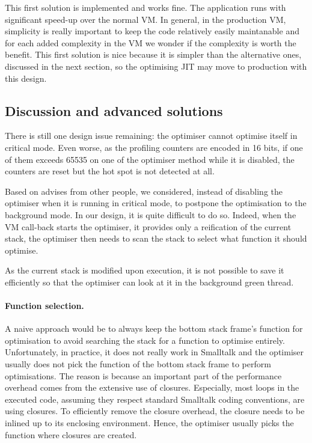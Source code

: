 \documentclass[a4paper,12pt,twoside]{../includes/ThesisStyle}
\begin{document}
This first solution is implemented and works fine. The application runs with significant speed-up over the normal VM. In general, in the production VM, simplicity is really important to keep the code relatively easily maintanable and for each added complexity in the VM we wonder if the complexity is worth the benefit. This first solution is nice because it is simpler than the alternative ones, discussed in the next section, so the optimising JIT may move to production with this design.

\subsection{Discussion and advanced solutions}

There is still one design issue remaining: the optimiser cannot optimise itself in critical mode. Even worse, as the profiling counters are encoded in 16 bits, if one of them exceeds 65535 on one of the optimiser method while it is disabled, the counters are reset but the hot spot is not detected at all.

Based on advises from other people, we considered, instead of disabling the optimiser when it is running in critical mode, to postpone the optimisation to the background mode. In our design, it is quite difficult to do so. Indeed, when the VM call-back starts the optimiser, it provides only a reification of the current stack, the optimiser then needs to scan the stack to select what function it should optimise. 

As the current stack is modified upon execution, it is not possible to save it efficiently so that the optimiser can look at it in the background green thread.

\paragraph{Function selection.} A naive approach would be to always keep the bottom stack frame's function for optimisation to avoid searching the stack for a function to optimise entirely. Unfortunately, in practice, it does not really work in Smalltalk and the optimiser usually does not pick the function of the bottom stack frame to perform optimisations. The reason is because an important part of the performance overhead comes from the extensive use of closures. Especially, most loops in the executed code, assuming they respect standard Smalltalk coding conventions, are using closures. To efficiently remove the closure overhead, the closure needs to be inlined up to its enclosing environment. Hence, the optimiser usually picks the function where closures are created. 
\end{document}
